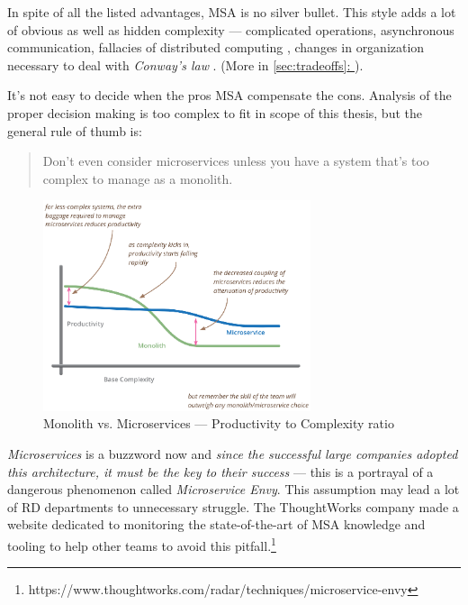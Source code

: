 \documentclass[thesis=M,english,hidelinks]{FITthesis}[2012/10/20]
\newcommand*{\fullref}[1]{\hyperref[{#1}]{\autoref*{#1}: \textit{\nameref*{#1}}}}
\begin{document}

In spite of all the listed advantages, \acrlong{MSA} is no silver bullet. This style adds a lot of obvious as well as hidden complexity --- complicated operations, asynchronous communication, fallacies of distributed computing \cite{devops-fallacies}, changes in organization necessary to deal with \textit{Conway's law} \cite{conways-law}. (More in \fullref{sec:tradeoffs}).

It's not easy to decide when the pros \acrshort{MSA} compensate the cons. Analysis of the proper decision making is too complex to fit in scope of this thesis, but the general rule of thumb is:
\begin{quote}
    Don't even consider microservices unless you have a system that's too complex to manage as a monolith.~\cite{ms-fow-monolith-first}
\end{quote}

\begin{figure}
  \centering
    \includegraphics[width=0.7\textwidth]{images/microservices_productivity.png}
    \caption[Monolith vs. Microservices --- Productivity to Complexity ratio]{Monolith vs. Microservices --- Productivity to Complexity ratio~\cite{ms-fow-monolith-first}}
    \label{fig:microservices_productivity}
\end{figure}


\textit{Microservices} is a buzzword now and \textit{since the successful large companies adopted this architecture, it must be the key to their success} --- this is a portrayal of a dangerous phenomenon called \textit{Microservice Envy}. This assumption may lead a lot of \acrshort{RD} departments to unnecessary struggle. The ThoughtWorks company made a website dedicated to monitoring the state-of-the-art of \acrshort{MSA} knowledge and tooling to help other teams to avoid this pitfall.\footnote{https://www.thoughtworks.com/radar/techniques/microservice-envy}
\end{document}
